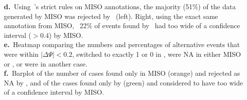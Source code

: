 \begin{minipage}{\textwidth}
{\textbf{d.}~Using \outrigger\,'s strict rules on MISO annotations, the majority (51\%) of the data generated by MISO was rejected by \outrigger\, (left). Right, using the exact same annotation from MISO, \outrigger\, 22\% of events found by \outrigger\, had too wide of a confidence interval ($>0.4$) by MISO.\\
\textbf{e.}~Heatmap comparing the numbers and percentages of alternative events that were within $|\Delta\Psi| < 0.2$, switched to exactly 1 or 0 in \outrigger, were NA in either MISO or \outrigger, or were in another case.\\
\textbf{f.}~Barplot of the number of cases found only in MISO (orange) and rejected as NA by \outrigger, and of the cases found only by \outrigger (green) and considered to have too wide of a confidence interval by MISO.\\
}
\end{minipage}
